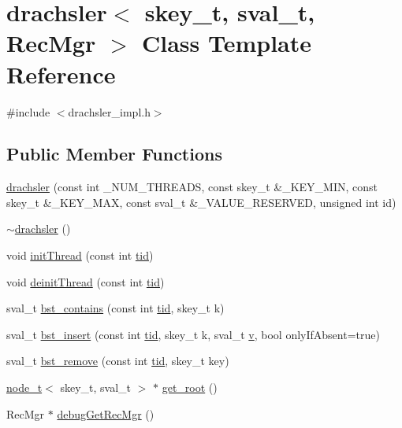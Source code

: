 \hypertarget{classdrachsler}{}\section{drachsler$<$ skey\+\_\+t, sval\+\_\+t, Rec\+Mgr $>$ Class Template Reference}
\label{classdrachsler}


{\ttfamily \#include $<$drachsler\+\_\+impl.\+h$>$}

\subsection*{Public Member Functions}
\begin{DoxyCompactItemize}
\item 
\hyperlink{classdrachsler_ae88b80491328980a365741f26c2c1d82}{drachsler} (const int \+\_\+\+N\+U\+M\+\_\+\+T\+H\+R\+E\+A\+DS, const skey\+\_\+t \&\+\_\+\+K\+E\+Y\+\_\+\+M\+IN, const skey\+\_\+t \&\+\_\+\+K\+E\+Y\+\_\+\+M\+AX, const sval\+\_\+t \&\+\_\+\+V\+A\+L\+U\+E\+\_\+\+R\+E\+S\+E\+R\+V\+ED, unsigned int id)
\item 
\hyperlink{classdrachsler_aa0986d5204a354bdb28827955c9897e9}{$\sim$drachsler} ()
\item 
void \hyperlink{classdrachsler_a5b779dc3d1eb620b4e91189b3409ce1b}{init\+Thread} (const int \hyperlink{microbench_2main_8cpp_a9ca9869868fe7e7a38a921cc7de4103f}{tid})
\item 
void \hyperlink{classdrachsler_a9f2a70d4fa52ccc1057f00ef1e68ee29}{deinit\+Thread} (const int \hyperlink{microbench_2main_8cpp_a9ca9869868fe7e7a38a921cc7de4103f}{tid})
\item 
sval\+\_\+t \hyperlink{classdrachsler_abc170bf0d3bf7dc4013ec9206d11eaec}{bst\+\_\+contains} (const int \hyperlink{microbench_2main_8cpp_a9ca9869868fe7e7a38a921cc7de4103f}{tid}, skey\+\_\+t k)
\item 
sval\+\_\+t \hyperlink{classdrachsler_aa3ac36b65117e6a719eafa17a7aa487f}{bst\+\_\+insert} (const int \hyperlink{microbench_2main_8cpp_a9ca9869868fe7e7a38a921cc7de4103f}{tid}, skey\+\_\+t k, sval\+\_\+t \hyperlink{reclaimer__ebr__tree__q_8h_acd3c1c4d280aac729e9fdb520dc99f20}{v}, bool only\+If\+Absent=true)
\item 
sval\+\_\+t \hyperlink{classdrachsler_adc53a3bc2cdb6511253e3bd2a0b77c52}{bst\+\_\+remove} (const int \hyperlink{microbench_2main_8cpp_a9ca9869868fe7e7a38a921cc7de4103f}{tid}, skey\+\_\+t key)
\item 
\hyperlink{structnode__t}{node\+\_\+t}$<$ skey\+\_\+t, sval\+\_\+t $>$ $\ast$ \hyperlink{classdrachsler_a4b411071d0df1797510d590a034a66d0}{get\+\_\+root} ()
\item 
Rec\+Mgr $\ast$ \hyperlink{classdrachsler_a11f6ed9e888d2d5328fd97e9c0901d70}{debug\+Get\+Rec\+Mgr} ()
\end{DoxyCompactItemize}



